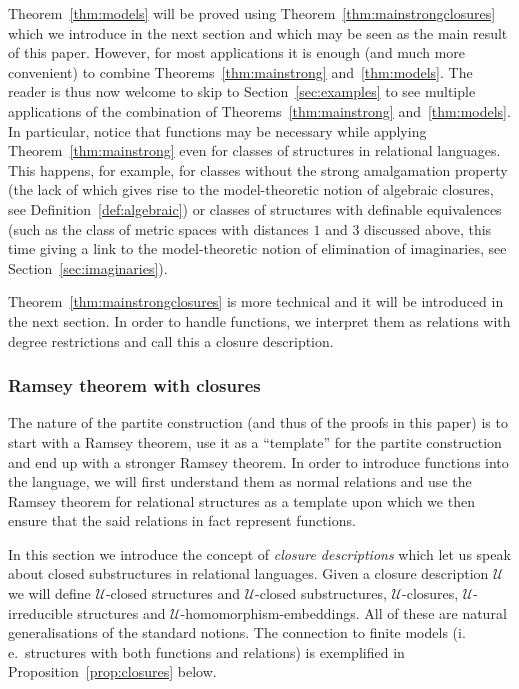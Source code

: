 \documentclass{elsarticle}
\newcommand{\ie}{i.\,e.}
\theoremstyle{plain}
\theoremstyle{definition}
\theoremstyle{remark}
\begin{document}
Theorem~\ref{thm:models} will be proved using Theorem~\ref{thm:mainstrongclosures} which we introduce in the next section and which may be seen
as the main result of this paper. However, for most applications it is enough (and much more convenient) to
combine Theorems~\ref{thm:mainstrong} and~\ref{thm:models}.
The reader is thus now welcome to skip to Section~\ref{sec:examples} to see multiple
applications of the combination of Theorems~\ref{thm:mainstrong} and~\ref{thm:models}. In particular, notice that
 functions may be necessary while applying Theorem~\ref{thm:mainstrong} even for 
classes of structures in relational languages. This happens, for example, for classes without the strong amalgamation property (the lack of which gives rise to the model-theoretic notion of algebraic closures, see Definition~\ref{def:algebraic}) or classes of structures with definable equivalences (such as the class of metric spaces with distances $1$ and $3$ discussed above, this time giving a link to the model-theoretic notion of elimination of imaginaries, see Section~\ref{sec:imaginaries}).

Theorem~\ref{thm:mainstrongclosures} is more technical and it will be
introduced in the next section. In order to handle functions, we interpret them
as relations with degree restrictions and call this a closure description.

\subsubsection{Ramsey theorem with closures}
The nature of the partite construction (and thus of the proofs in this paper) is to start with a Ramsey theorem, use it as a ``template'' for the partite construction and end up with a stronger Ramsey theorem. In order to introduce functions into the language, we will first understand them as normal relations and use the Ramsey theorem for relational structures as a template upon which we then ensure that the said relations in fact represent functions.

  In this section we introduce the concept of \emph{closure descriptions} which let us speak about
closed substructures in relational languages. Given a closure description
$\mathcal U$ we will define $\mathcal U$-closed structures
and $\mathcal U$-closed substructures, $\mathcal U$-closures, $\mathcal
U$-irreducible structures and $\mathcal U$-homomorphism-embeddings.  All of these
are natural generalisations of the standard notions. The connection to finite models (\ie{}\ structures with
both functions and relations) is exemplified in Proposition~\ref{prop:closures} below.
\end{document}
